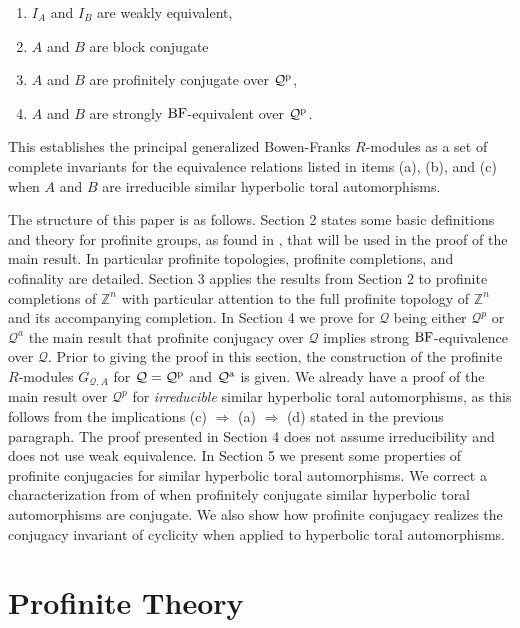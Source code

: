 \documentclass{amsart}
\theoremstyle{plain}
\theoremstyle{definition}
\theoremstyle{remark}
\begin{document}
\begin{enumerate}
\item[(a)] $I_A$ and $I_B$ are weakly equivalent,
\item[(b)] $A$ and $B$ are block conjugate
\item[(c)] $A$ and $B$ are profinitely conjugate over ${\mathcal Q}^{\rm p}$,
\item[(d)] $A$ and $B$ are strongly ${\rm BF}$-equivalent over ${\mathcal Q}^{\rm p}$.
\end{enumerate}
This establishes the principal generalized Bowen-Franks $R$-modules as a set of complete invariants for the equivalence relations listed in items (a), (b), and (c) when $A$ and $B$ are irreducible similar hyperbolic toral automorphisms.

The structure of this paper is as follows. Section 2 states some basic definitions and theory for profinite groups, as found in \cite{RZ10}, that will be used in the proof of the main result. In particular profinite topologies, profinite completions, and cofinality are detailed. Section 3 applies the results from Section 2 to profinite completions of ${\mathbb Z}^n$ with particular attention to the full profinite topology of ${\mathbb Z}^n$ and its accompanying completion. In Section 4 we prove for ${\mathcal Q}$ being either ${\mathcal Q}^p$ or ${\mathcal Q}^a$ the main result that profinite conjugacy over ${\mathcal Q}$ implies strong ${\rm BF}$-equivalence over ${\mathcal Q}$. Prior to giving the proof in this section, the construction of the profinite $R$-modules $G_{{\mathcal Q},A}$ for ${\mathcal Q} = {\mathcal Q}^{\rm p}$ and ${\mathcal Q}^{\rm a}$ is given. We already have a proof of the main result over ${\mathcal Q}^p$ for {\it irreducible} similar hyperbolic toral automorphisms, as this follows from the implications (c) $\Rightarrow$ (a) $\Rightarrow$ (d) stated in the previous paragraph. The proof presented in Section 4 does not assume irreducibility and does not use weak equivalence. In Section 5 we present some properties of profinite conjugacies for similar hyperbolic toral automorphisms. We correct a characterization from \cite{BM12} of when profinitely conjugate similar hyperbolic toral automorphisms are conjugate. We also show how profinite conjugacy realizes the conjugacy invariant of cyclicity when applied to hyperbolic toral automorphisms.


\section{Profinite Theory}
\end{document}
